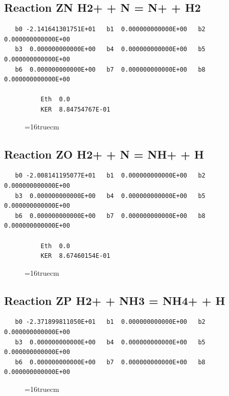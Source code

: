 \documentclass[12pt,dvipdfm]{article}
\begin{document}
\subsection{
Reaction ZN H2+ + N = N+ + H2 }
\begin{small}\begin{verbatim}
   b0 -2.141641301751E+01   b1  0.000000000000E+00   b2  0.000000000000E+00
   b3  0.000000000000E+00   b4  0.000000000000E+00   b5  0.000000000000E+00
   b6  0.000000000000E+00   b7  0.000000000000E+00   b8  0.000000000000E+00

          Eth  0.0
          KER  8.84754767E-01
\end{verbatim}\end{small}
\begin{figure}[h!] \label{n2rates}
\epsfxsize=16truecm
\end{figure}
\newpage

\subsection{
Reaction ZO H2+ + N = NH+ + H }
\begin{small}\begin{verbatim}
   b0 -2.008141195077E+01   b1  0.000000000000E+00   b2  0.000000000000E+00
   b3  0.000000000000E+00   b4  0.000000000000E+00   b5  0.000000000000E+00
   b6  0.000000000000E+00   b7  0.000000000000E+00   b8  0.000000000000E+00

          Eth  0.0
          KER  8.67460154E-01
\end{verbatim}\end{small}
\begin{figure}[h!] \label{n2rates}
\epsfxsize=16truecm
\end{figure}
\newpage

\subsection{
Reaction ZP H2+ + NH3 = NH4+ + H }
\begin{small}\begin{verbatim}
   b0 -2.371899811050E+01   b1  0.000000000000E+00   b2  0.000000000000E+00
   b3  0.000000000000E+00   b4  0.000000000000E+00   b5  0.000000000000E+00
   b6  0.000000000000E+00   b7  0.000000000000E+00   b8  0.000000000000E+00
\end{verbatim}\end{small}
\begin{figure}[h!] \label{n2rates}
\epsfxsize=16truecm
\end{figure}
\newpage
\end{document}

